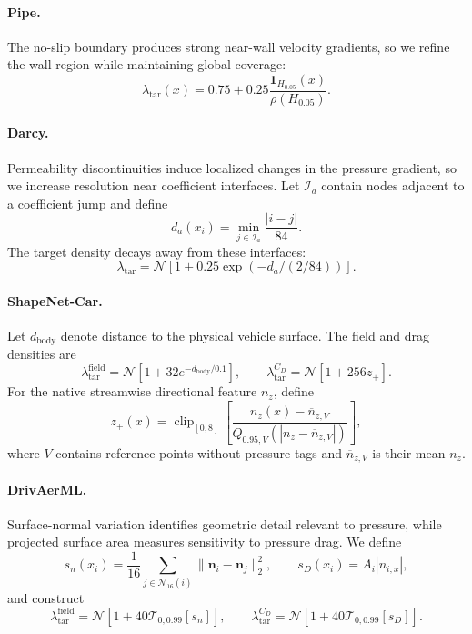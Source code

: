 \paragraph{Pipe.}
The no-slip boundary produces strong near-wall velocity gradients, so we refine
the wall region while maintaining global coverage:
\begin{equation}
    \lambda_{\mathrm{tar}}(x)
    =0.75
    +0.25\frac{\mathbf{1}_{H_{0.05}}(x)}
                  {\rho(H_{0.05})}.
    \label{eq:app_pi_pipe_density}
\end{equation}

\paragraph{Darcy.}
Permeability discontinuities induce localized changes in the pressure gradient,
so we increase resolution near coefficient interfaces. Let $\mathcal{I}_a$
contain nodes adjacent to a coefficient jump and define
\[
    d_a(x_i)
    =\min_{j\in\mathcal{I}_a}\frac{|i-j|}{84}.
\]
The target density decays away from these interfaces:
\begin{equation}
    \lambda_{\mathrm{tar}}
    =\mathcal{N}\!\left[
        1+0.25\exp\!\left(-d_a/(2/84)\right)
    \right].
    \label{eq:app_pi_darcy_density}
\end{equation}

\paragraph{ShapeNet-Car.}
Let $d_{\mathrm{body}}$ denote distance to the physical vehicle surface.
The field and drag densities are
\begin{equation}
    \lambda_{\mathrm{tar}}^{\mathrm{field}}
    =\mathcal{N}\!\left[1+32e^{-d_{\mathrm{body}}/0.1}\right],
    \qquad
    \lambda_{\mathrm{tar}}^{C_D}
    =\mathcal{N}[1+256z_+].
    \label{eq:app_pi_car_density}
\end{equation}
For the native streamwise directional feature $n_z$, define
\[
    z_+(x)=\operatorname{clip}_{[0,8]}\!\left[
        \frac{n_z(x)-\overline n_{z,V}}
             {Q_{0.95,V}(|n_z-\overline n_{z,V}|)}
    \right],
\]
where $V$ contains reference points without pressure tags and
$\overline n_{z,V}$ is their mean $n_z$.

\paragraph{DrivAerML.}
Surface-normal variation identifies geometric detail relevant to pressure,
while projected surface area measures sensitivity to pressure drag. We define
\[
    s_n(x_i)
    =\frac{1}{16}
      \sum_{j\in\mathcal{N}_{16}(i)}
      \|\mathbf n_i-\mathbf n_j\|_2^2,
    \qquad
    s_D(x_i)=A_i|n_{i,x}|,
\]
and construct
\begin{equation}
    \lambda_{\mathrm{tar}}^{\mathrm{field}}
    =\mathcal{N}\!\left[
        1+40\mathcal{T}_{0,0.99}[s_n]
    \right],
    \qquad
    \lambda_{\mathrm{tar}}^{C_D}
    =\mathcal{N}\!\left[
        1+40\mathcal{T}_{0,0.99}[s_D]
    \right].
    \label{eq:app_pi_drivaerml_density}
\end{equation}

